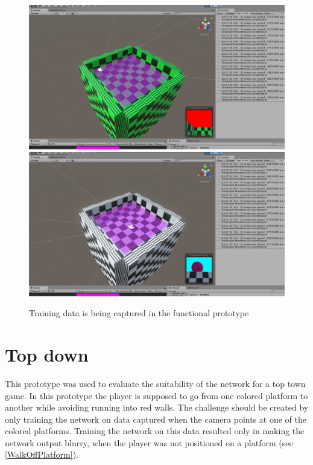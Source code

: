 \begin{figure}[p]
  \centering
  \includegraphics[width=\imgWidth]{images/workflow/Functional1.png} \\[\picVdist]
  \includegraphics[width=\imgWidth]{images/workflow/Functional2.png}
  \caption{Training data is being captured in the functional prototype}
  \label{FunctionalCapture}
\end{figure}

\section{Top down}
This prototype was used to evaluate the suitability of the network for a top town game. In this prototype the player is supposed to go from one colored platform to another while avoiding running into red walls. The challenge should be created by only training the network on data captured when the camera points at one of the colored platforms. Training the network on this data resulted only in making the network output blurry, when the player was not positioned on a platform (see \cref{WalkOffPlatform}).

